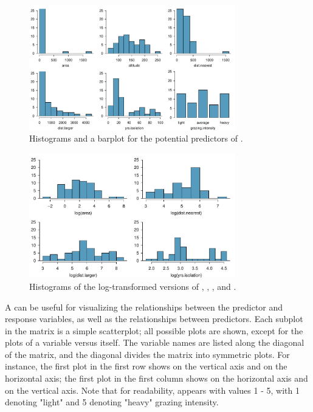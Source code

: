 \begin{figure}[h!]
	\centering
	\includegraphics[width=0.8\textwidth]
	{ch_multiple_linear_regression_oi_biostat/figures/forestbirdsPredictorDist/forestbirdsPredictorDist.pdf}
    \caption{Histograms and a barplot for the potential predictors of .}
   	\label{forestbirdsPredictorDist}
\end{figure}

\begin{figure}[h!]
	\centering
	\includegraphics[width=0.8\textwidth]
	{ch_multiple_linear_regression_oi_biostat/figures/forestbirdsLogPredictorDist/forestbirdsLogPredictorDist.pdf}
    \caption{Histograms of the log-transformed versions of , , , and .}
   	\label{forestbirdsLogPredictorDist}
\end{figure}

A  can be useful for visualizing the relationships between the predictor and response variables, as well as the relationships between predictors. Each subplot in the matrix is a simple scatterplot; all possible plots are shown, except for the plots of a variable versus itself. The variable names are listed along the diagonal of the matrix, and the diagonal divides the matrix into symmetric plots. For instance, the first plot in the first row shows  on the vertical axis and  on the horizontal axis; the first plot in the first column shows  on the horizontal axis and  on the vertical axis. Note that for readability,  appears with values 1 - 5, with 1 denoting "light" and 5 denoting "heavy" grazing intensity.
   
